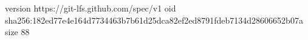version https://git-lfs.github.com/spec/v1
oid sha256:182ed77e4e164d7734463b7b61d25dca82ef2ed8791fdeb7134d28606652b07a
size 88
